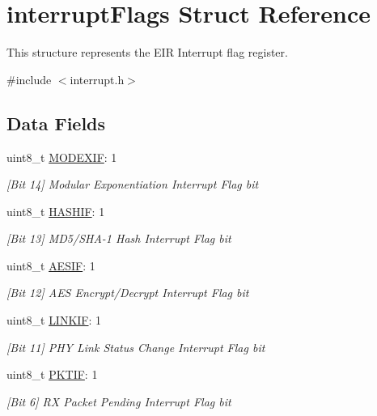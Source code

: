 \hypertarget{structinterrupt_flags}{}\section{interrupt\+Flags Struct Reference}
\label{structinterrupt_flags}


This structure represents the E\+IR Interrupt flag register.  




{\ttfamily \#include $<$interrupt.\+h$>$}

\subsection*{Data Fields}
\begin{DoxyCompactItemize}
\item 
uint8\+\_\+t \mbox{\hyperlink{structinterrupt_flags_ad01e267d93eace1bc14b2e98c7a6e23b}{M\+O\+D\+E\+X\+IF}}\+: 1
\begin{DoxyCompactList}\small\item\em \mbox{[}Bit 14\mbox{]} Modular Exponentiation Interrupt Flag bit \end{DoxyCompactList}\item 
uint8\+\_\+t \mbox{\hyperlink{structinterrupt_flags_a083a2864d9aeecec83f03864835afd68}{H\+A\+S\+H\+IF}}\+: 1
\begin{DoxyCompactList}\small\item\em \mbox{[}Bit 13\mbox{]} M\+D5/\+S\+H\+A-\/1 Hash Interrupt Flag bit \end{DoxyCompactList}\item 
uint8\+\_\+t \mbox{\hyperlink{structinterrupt_flags_a710067270606b70dbaf2bbb5aadb5ce9}{A\+E\+S\+IF}}\+: 1
\begin{DoxyCompactList}\small\item\em \mbox{[}Bit 12\mbox{]} A\+ES Encrypt/\+Decrypt Interrupt Flag bit \end{DoxyCompactList}\item 
uint8\+\_\+t \mbox{\hyperlink{structinterrupt_flags_a4f301cfd9cfc49b105a5f703947a2298}{L\+I\+N\+K\+IF}}\+: 1
\begin{DoxyCompactList}\small\item\em \mbox{[}Bit 11\mbox{]} P\+HY Link Status Change Interrupt Flag bit \end{DoxyCompactList}\item 
uint8\+\_\+t \mbox{\hyperlink{structinterrupt_flags_a4bfff8bb603cb3baf42fabe79d5e0a39}{P\+K\+T\+IF}}\+: 1
\begin{DoxyCompactList}\small\item\em \mbox{[}Bit 6\mbox{]} RX Packet Pending Interrupt Flag bit \end{DoxyCompactList}\item 

\end{DoxyCompactItemize}
